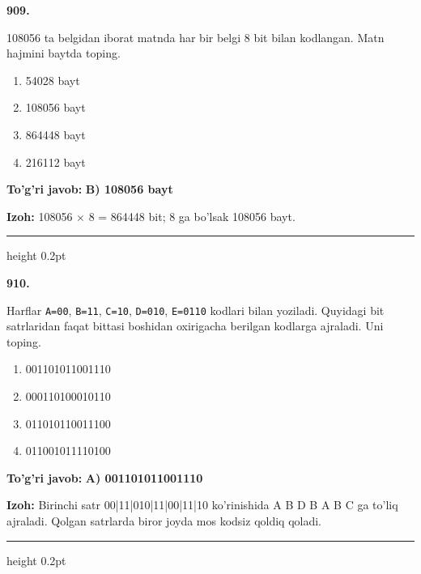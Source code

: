 \documentclass[10pt,a4paper,oneside]{article}
\begin{document}
\noindent\textbf{\color{ink}909.}
\par
108056 ta belgidan iborat matnda har bir belgi 8 bit bilan kodlangan. Matn hajmini baytda toping.
\begin{enumerate}[label=\Alph*),leftmargin=9mm]
\item 54028 bayt
\item 108056 bayt
\item 864448 bayt
\item 216112 bayt
\end{enumerate}
\begin{tcolorbox}[enhanced,breakable,colback=teal!4,colframe=teal!50!black,boxrule=0.5pt,arc=1.1mm,left=3mm,right=3mm,top=1.7mm,bottom=1.7mm,before skip=2mm,after skip=2mm]
\textbf{\color{teal}To'g'ri javob:} \textbf{B) 108056 bayt}
\par\smallskip
\textbf{Izoh:} 108056 \ensuremath{\times} 8 = 864448 bit; 8 ga bo'lsak 108056 bayt.
\end{tcolorbox}
\vspace{2mm}\hrule height 0.2pt \vspace{3mm}

\noindent\textbf{\color{ink}910.}
\par
Harflar \texttt{A=00}, \texttt{B=11}, \texttt{C=10}, \texttt{D=010}, \texttt{E=0110} kodlari bilan yoziladi. Quyidagi bit satrlaridan faqat bittasi boshidan oxirigacha berilgan kodlarga ajraladi. Uni toping.
\begin{enumerate}[label=\Alph*),leftmargin=9mm]
\item 001101011001110
\item 000110100010110
\item 011010110011100
\item 011001011110100
\end{enumerate}
\begin{tcolorbox}[enhanced,breakable,colback=teal!4,colframe=teal!50!black,boxrule=0.5pt,arc=1.1mm,left=3mm,right=3mm,top=1.7mm,bottom=1.7mm,before skip=2mm,after skip=2mm]
\textbf{\color{teal}To'g'ri javob:} \textbf{A) 001101011001110}
\par\smallskip
\textbf{Izoh:} Birinchi satr 00|11|010|11|00|11|10 ko'rinishida A B D B A B C ga to'liq ajraladi. Qolgan satrlarda biror joyda mos kodsiz qoldiq qoladi.
\end{tcolorbox}
\vspace{2mm}\hrule height 0.2pt \vspace{3mm}
\end{document}
